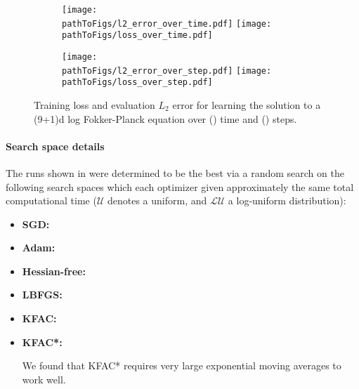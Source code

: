 \begin{figure}[!h]
  \centering
  \def\pathToFigs{kfac_pinns_exp/exp43_log_fokker_planck9d_isotropic_gaussian_random}
  \begin{subfigure}[t]{1.0\linewidth}
    \caption{}\label{subfig:fokker_10d-time}
    \texttt{[image: \\pathToFigs/l2\_error\_over\_time.pdf]}
    \texttt{[image: \\pathToFigs/loss\_over\_time.pdf]}
  \end{subfigure}
  \begin{subfigure}[t]{1.0\linewidth}
    \caption{}\label{subfig:fokker_10d-step}
    \texttt{[image: \\pathToFigs/l2\_error\_over\_step.pdf]}
    \texttt{[image: \\pathToFigs/loss\_over\_step.pdf]}
  \end{subfigure}
  \caption{Training loss and evaluation $L_2$ error for
  learning the solution to a (9+1)d log Fokker-Planck equation
  over () time and () steps.}\label{fig:fokker_10d-appendix}
\end{figure}

\paragraph{Search space details} The runs shown in
 were determined to be the best
via a random search on the following search spaces which each
optimizer given approximately the same total
computational time ($\mathcal{U}$ denotes a uniform,
and $\mathcal{LU}$ a log-uniform distribution):
\begin{itemize}
  \def\pathToRuns{kfac_pinns_exp/exp43_log_fokker_planck9d_isotropic_gaussian_random/tex}
\item \textbf{SGD:} 
\item \textbf{Adam:} 
\item \textbf{Hessian-free:} 
\item \textbf{LBFGS:} 
\item \textbf{KFAC:} 
\item \textbf{KFAC*:} 

  We found that KFAC* requires very large exponential moving averages to work well.
\end{itemize}

